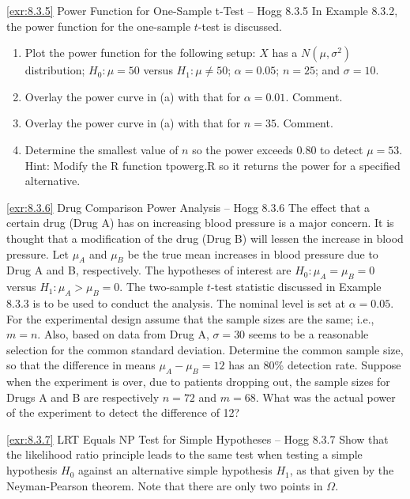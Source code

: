 \begin{exercise}{\ref{exr:8.3.5} Power Function for One-Sample t-Test -- Hogg 8.3.5}\label{exr:8.3.5}
In Example 8.3.2, the power function for the one-sample $t$-test is discussed.
\begin{enumerate}
\item[(a)] Plot the power function for the following setup: $X$ has a $N(\mu, \sigma^2)$ distribution; $H_0: \mu = 50$ versus $H_1: \mu \neq 50$; $\alpha = 0.05$; $n = 25$; and $\sigma = 10$.
\item[(b)] Overlay the power curve in (a) with that for $\alpha = 0.01$. Comment.
\item[(c)] Overlay the power curve in (a) with that for $n = 35$. Comment.
\item[(d)] Determine the smallest value of $n$ so the power exceeds 0.80 to detect $\mu = 53$. Hint: Modify the R function tpowerg.R so it returns the power for a specified alternative.
\end{enumerate}
\end{exercise}

\begin{exercise}{\ref{exr:8.3.6} Drug Comparison Power Analysis -- Hogg 8.3.6}\label{exr:8.3.6}
The effect that a certain drug (Drug A) has on increasing blood pressure is a major concern. It is thought that a modification of the drug (Drug B) will lessen the increase in blood pressure. Let $\mu_A$ and $\mu_B$ be the true mean increases in blood pressure due to Drug A and B, respectively. The hypotheses of interest are $H_0: \mu_A = \mu_B = 0$ versus $H_1: \mu_A > \mu_B = 0$. The two-sample $t$-test statistic discussed in Example 8.3.3 is to be used to conduct the analysis. The nominal level is set at $\alpha = 0.05$. For the experimental design assume that the sample sizes are the same; i.e., $m = n$. Also, based on data from Drug A, $\sigma = 30$ seems to be a reasonable selection for the common standard deviation. Determine the common sample size, so that the difference in means $\mu_A - \mu_B = 12$ has an 80\% detection rate. Suppose when the experiment is over, due to patients dropping out, the sample sizes for Drugs A and B are respectively $n = 72$ and $m = 68$. What was the actual power of the experiment to detect the difference of 12?
\end{exercise}

\begin{exercise}{\ref{exr:8.3.7} LRT Equals NP Test for Simple Hypotheses -- Hogg 8.3.7}\label{exr:8.3.7}
Show that the likelihood ratio principle leads to the same test when testing a simple hypothesis $H_0$ against an alternative simple hypothesis $H_1$, as that given by the Neyman-Pearson theorem. Note that there are only two points in $\Omega$.
\end{exercise}

